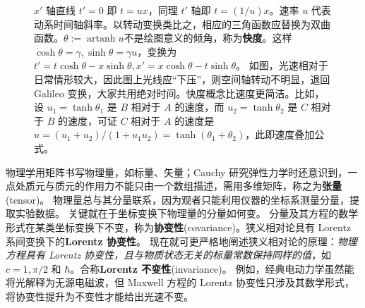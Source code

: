 \begin{figure}[p]
    \caption{\small
    $x'$ 轴直线 $t'=0$ 即 $t=u x$，同理 $t'$ 轴即 $t=(1 / u) x$。速率 $u$ 代表动系时间轴斜率。以转动变换类比之，相应的三角函数应替换为双曲函数。$\theta:=\operatorname{artanh}u$不是绘图意义的倾角，称为\textbf{快度}。这样 $\cosh\theta=\gamma,  \sinh\theta=\gamma u$，变换为 $t'= t\cosh\theta - x\sinh\theta, x'= x\cosh\theta -t \sinh\theta$。
    如图，光速相对于日常情形较大，因此图上光线应“下压”，则空间轴转动不明显，退回 Galileo 变换，大家共用绝对时间。快度概念比速度更简洁。比如，设 $u_1=\tanh\theta_{1}$ 是 $B$ 相对于 $A$ 的速度，而 $u_2=\tanh\theta_{2}$ 是 $C$ 相对于 $B$ 的速度，可证 $C$ 相对于 $A$ 的速度是 $u={(u_{1}+u_{2})}/{(1+u_{1} u_{2})}=\tanh(\theta_1+\theta_{2})$，此即速度叠加公式。
    }\label{fig:boost}
\end{figure}

物理学用矩阵书写物理量，如标量、矢量；Cauchy 研究弹性力学时还意识到，一点处质元与质元的作用力不能只由一个数组描述，需用多维矩阵，称之为\textbf{张量}(tensor)。
物理量总与其分量联系，因为观者只能利用仪器的坐标系测量分量，提取实验数据。
关键就在于坐标变换下物理量的分量如何变。
分量及其方程的数学形式在某类坐标变换下不变，称为\textbf{协变性}(covariance)。狭义相对论具有 Lorentz 系间变换下的\textbf{Lorentz 协变性}。
现在就可更严格地阐述狭义相对论的原理：\textit{物理方程具有 Lorentz 协变性，且与物质状态无关的标量常数保持同样的值}，如 $c=1,\pi/2$ 和 $\hbar$。合称\textbf{Lorentz 不变性}(invariance)。
例如，经典电动力学虽然能将光解释为无源电磁波，但 Maxwell 方程的 Lorentz 协变性只涉及其数学形式，将协变性提升为不变性才能给出光速不变。

